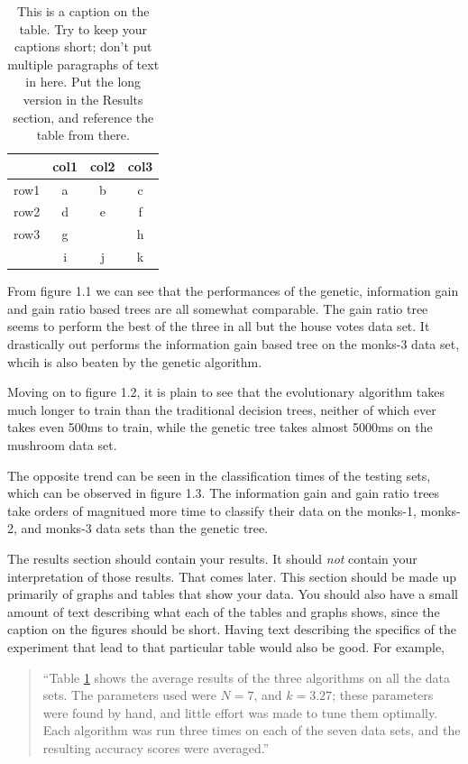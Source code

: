 \documentclass[12pt, letterpaper]{article}
\begin{document}
\begin{table}
\begin{center}
\begin{tabular}{|c||c|cc}
\hline
& col1 & col2 & col3\\
\hline \hline
row1 & a & b & c\\
\hline 
row2 & d & e & f\\
\hline 
row3 & g &   & h\\
 & i & j & k\\
\hline 
\end{tabular}
\end{center}
\caption{This is a caption on the table.  Try to keep your captions short; don't
put multiple paragraphs of text in here.  Put the long version in the Results
section, and reference the table from there.}
\label{sometable}
\end{table}
From figure 1.1 we can see that the performances of the genetic, information
gain and gain ratio based trees are all somewhat comparable.  The gain ratio
tree seems to perform the best of the three in all but the house votes data set.
It drastically out performs the information gain based tree on the monks-3 data
set, whcih is also beaten by the genetic algorithm.

Moving on to figure 1.2, it is plain to see that the evolutionary algorithm
takes much longer to train than the traditional decision trees, neither of which
ever takes even 500ms to train, while the genetic tree takes almost 5000ms on 
the mushroom data set.

The opposite trend can be seen in the classification times of the testing sets,
which can be observed in figure 1.3.
The information gain and gain ratio trees take orders of magnitued more time
to classify their data on the monks-1, monks-2, and monks-3 data sets than the
genetic tree.


The results section should contain your results.  It should \emph{not} contain
your interpretation of those results.  That comes later.  This section should be
made up primarily of graphs and tables that show your data.  You should also
have a small amount of text describing what each of the tables and graphs shows,
since the caption on the figures should be short.  Having text describing the
specifics of the experiment that lead to that particular table would also be
good.  For example,

\begin{quote}
``Table \ref{sometable} shows the average results of the three algorithms on all
the data sets.  The parameters used were $N=7$, and $k=3.27$; these parameters
were found by hand, and little effort was made to tune them optimally.  Each
algorithm was run three times on each of the seven data sets, and the resulting
accuracy scores were averaged.''
\end{quote}
\end{document}
